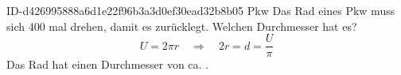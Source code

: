 \begin{exercise}
      {ID-d426995888a6d1e22f96b3a3d0ef30ead32b8b05}
      {Pkw}
  \ifproblem\problem
    Das Rad eines Pkw muss sich \num{400} mal drehen, damit es 
    zurücklegt. Welchen Durchmesser hat es?
  \fi
  \ifoutline\outline
    \begin{equation*}
      U=2\pi r
      \quad\Rightarrow\quad
      2r=d=\frac{U}{\pi}
    \end{equation*}
  \fi
  \ifoutcome\outcome
    Das Rad hat einen Durchmesser von ca. .
  \fi
\end{exercise}
